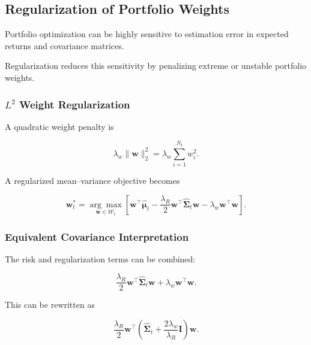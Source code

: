 \documentclass[11pt,a4paper]{article}
\begin{document}
\subsection{Regularization of Portfolio Weights}
\label{subsec:portfolio_weight_regularization}

Portfolio optimization can be highly sensitive to estimation error in expected
returns and covariance matrices.

Regularization reduces this sensitivity by penalizing extreme or unstable
portfolio weights.


\subsubsection{$L^2$ Weight Regularization}

A quadratic weight penalty is

\begin{equation}
\boxed{
\lambda_w
\|\mathbf{w}\|_2^2
=
\lambda_w
\sum_{i=1}^{N_t}
w_i^2.
}
\end{equation}

A regularized mean--variance objective becomes

\begin{equation}
\boxed{
\mathbf{w}_t^{*}
=
\underset{\mathbf{w}\in\mathcal{W}_t}{\arg\max}
\left[
\mathbf{w}^{\top}
\widehat{\boldsymbol{\mu}}_t
-
\frac{\lambda_R}{2}
\mathbf{w}^{\top}
\widehat{\boldsymbol{\Sigma}}_t
\mathbf{w}
-
\lambda_w
\mathbf{w}^{\top}\mathbf{w}
\right].
}
\end{equation}


\subsubsection{Equivalent Covariance Interpretation}

The risk and regularization terms can be combined:

\begin{equation}
\frac{\lambda_R}{2}
\mathbf{w}^{\top}
\widehat{\boldsymbol{\Sigma}}_t
\mathbf{w}
+
\lambda_w
\mathbf{w}^{\top}\mathbf{w}.
\end{equation}

This can be rewritten as

\begin{equation}
\boxed{
\frac{\lambda_R}{2}
\mathbf{w}^{\top}
\left(
\widehat{\boldsymbol{\Sigma}}_t
+
\frac{2\lambda_w}{\lambda_R}
\mathbf{I}
\right)
\mathbf{w}.
}
\end{equation}
\end{document}
